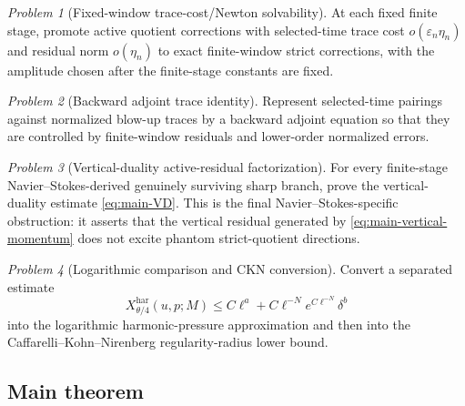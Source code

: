 \documentclass[11pt]{article}
\numberwithin{equation}{section}
\theoremstyle{plain}
\theoremstyle{definition}
\theoremstyle{remark}
\newtheorem{problem}{Problem}[section]
\newcommand{\eps}{\varepsilon}
\newcommand{\har}{\mathrm{har}}
\begin{document}
\begin{problem}[Fixed-window trace-cost/Newton solvability]\label{prob:fixed-window-newton}
At each fixed finite stage, promote active quotient corrections with selected-time trace cost \(o(\eps_n\eta_n)\) and residual norm \(o(\eta_n)\) to exact finite-window strict corrections, with the amplitude chosen after the finite-stage constants are fixed.
\end{problem}

\begin{problem}[Backward adjoint trace identity]\label{prob:adjoint-trace}
Represent selected-time pairings against normalized blow-up traces by a backward adjoint equation so that they are controlled by finite-window residuals and lower-order normalized errors.
\end{problem}

\begin{problem}[Vertical-duality active-residual factorization]\label{prob:vd-factorization}
For every finite-stage Navier--Stokes-derived genuinely surviving sharp branch, prove the vertical-duality estimate \eqref{eq:main-VD}.  This is the final Navier--Stokes-specific obstruction: it asserts that the vertical residual generated by \eqref{eq:main-vertical-momentum} does not excite phantom strict-quotient directions.
\end{problem}

\begin{problem}[Logarithmic comparison and CKN conversion]\label{prob:log-ckn}
Convert a separated estimate
\[
        X^{\har}_{\theta/4}(u,p;M)
        \le C\ell^a+C\ell^{-N}e^{C\ell^{-N}}\delta^b
\]
into the logarithmic harmonic-pressure approximation and then into the Caffarelli--Kohn--Nirenberg regularity-radius lower bound.
\end{problem}

\subsection{Main theorem}\label{subsec:main-theorem}
\end{document}
